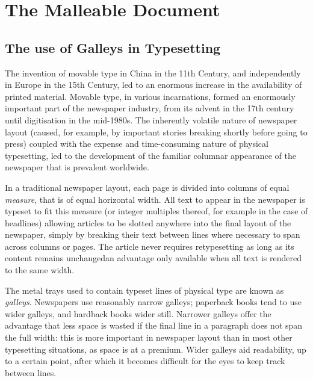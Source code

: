 \cleardoublepage
\chapter{The Malleable Document}\label{ch:malleable}  %


\section{The use of Galleys in Typesetting}
The invention of movable type in China in the 11th Century, and independently in Europe in the 15th Century, led to an enormous increase in the availability of printed material. Movable type, in various incarnations, formed an enormously important part of the newspaper industry, from its advent in the 17th century until digitisation in the mid-1980s. The inherently volatile nature of newspaper layout (caused, for example, by important stories breaking shortly before going to press) coupled with the expense and time-consuming nature of physical typesetting, led to the development of the familiar columnar appearance of the newspaper that is prevalent worldwide.

In a traditional newspaper layout, each page is divided into columns of equal \emph{measure}, that is of equal horizontal width. All text to appear in the newspaper is typeset to fit this measure (or integer multiples thereof, for example in the case of headlines) allowing articles to be slotted anywhere into the final layout of the newspaper, simply by breaking their text between lines where necessary to span across columns or pages. The article never requires retypesetting as long as its content remains unchanged\ed{}an advantage only available when all text is rendered to the same width.


The metal trays used to contain typeset lines of physical type are known as \emph{galleys}. Newspapers use reasonably narrow galleys; paperback books tend to use wider galleys, and hardback books wider still. Narrower galleys offer the advantage that less space is wasted if the final line in a paragraph does not span the full width: this is more important in newspaper layout than in most other typesetting situations, as space is at a premium. Wider galleys aid readability, up to a certain point, after which it becomes difficult for the eyes to keep track between lines.\cite{Bringhurst2008, Voorhees2011}


